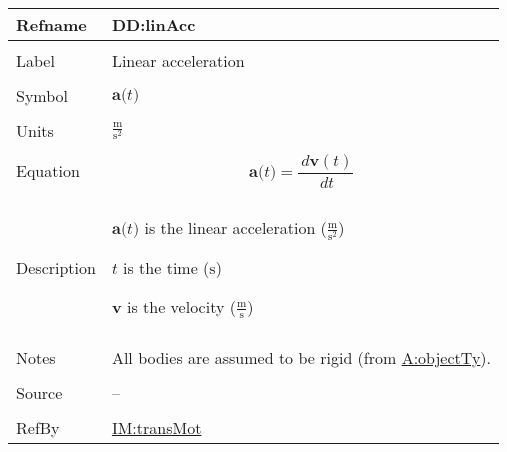 \documentclass[12pt]{article}
\begin{document}
\vspace{\baselineskip}
\noindent
\begin{minipage}{\textwidth}
\begin{tabular}{>{\raggedright}p{}>{\raggedright\arraybackslash}p{}}
\toprule \textbf{Refname} & \textbf{DD:linAcc}
\label{DD:linAcc}
\\ \midrule \\
Label & Linear acceleration
        
\\ \midrule \\
Symbol & $\symbf{a}\text{(}t\text{)}$
         
\\ \midrule \\
Units & $\frac{\text{m}}{\text{s}^{2}}$
        
\\ \midrule \\
Equation & \begin{displaymath}
           \symbf{a}\text{(}t\text{)}=\frac{\,d\symbf{v}\left(t\right)}{\,dt}
           \end{displaymath}
\\ \midrule \\
Description & \begin{symbDescription}
              \item{$\symbf{a}\text{(}t\text{)}$ is the linear acceleration ($\frac{\text{m}}{\text{s}^{2}}$)}
              \item{$t$ is the time (${\text{s}}$)}
              \item{$\symbf{v}$ is the velocity ($\frac{\text{m}}{\text{s}}$)}
              \end{symbDescription}
\\ \midrule \\
Notes & All bodies are assumed to be rigid (from \hyperref[assumpOT]{A:objectTy}).
        
\\ \midrule \\
Source & --
         
\\ \midrule \\
RefBy & \hyperref[IM:transMot]{IM:transMot}
        
\\ \bottomrule
\end{tabular}
\end{minipage}
\end{document}

